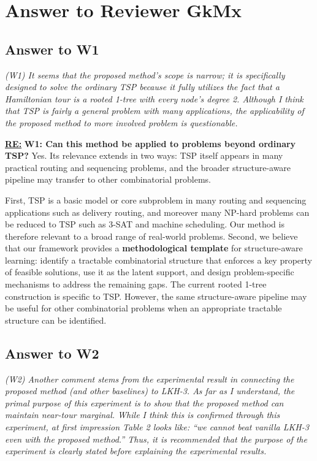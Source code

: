 \section{Answer to Reviewer GkMx}


\subsection{Answer to W1}

\textit{(W1) It seems that the proposed method's scope is narrow; it is specifically designed to solve the ordinary TSP because it fully utilizes the fact that a Hamiltonian tour is a rooted 1-tree with every node's degree 2. Although I think that TSP is fairly a general problem with many applications, the applicability of the proposed method to more involved problem is questionable.}

\textbf{\underline{RE:}}
\textbf{W1: Can this method be applied to problems beyond ordinary TSP?} Yes. Its relevance extends in two ways: TSP itself appears in many practical routing and sequencing problems, and the broader structure-aware pipeline may transfer to other combinatorial problems. 

First, TSP is a basic model or core subproblem in many routing and sequencing applications such as delivery routing, and moreover many NP-hard problems can be reduced to TSP such as 3-SAT and machine scheduling. Our method is therefore relevant to a broad range of real-world problems. Second, we believe that our framework provides a \textbf{methodological template} for structure-aware learning: identify a tractable combinatorial structure that enforces a key property of feasible solutions, use it as the latent support, and design problem-specific mechanisms to address the remaining gaps. The current rooted 1-tree construction is specific to TSP. However, the same structure-aware pipeline may be useful for other combinatorial problems when an appropriate tractable structure can be identified.


\subsection{Answer to W2}

\textit{(W2) Another comment stems from the experimental result in connecting the proposed method (and other baselines) to LKH-3. As far as I understand, the primal purpose of this experiment is to show that the proposed method can maintain near-tour marginal. While I think this is confirmed through this experiment, at first impression Table 2 looks like: ``we cannot beat vanilla LKH-3 even with the proposed method.'' Thus, it is recommended that the purpose of the experiment is clearly stated before explaining the experimental results.}

